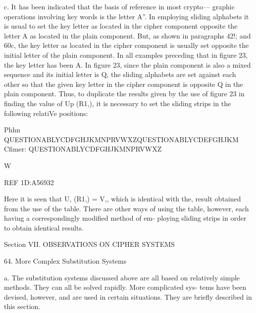 {{{c. It has been indicated that the basis of reference in most crypto—
graphic operations involving key words is the letter A”. In employing
sliding alphabets it is usual to set the key letter as located in the cipher
component opposite the letter A as located in the plain component. But,
as shown in paragraphs 42!; and 60c, the key letter as located in the
cipher component is usually set opposite the initial letter of the plain
component. In all examples preceding that in ﬁgure 23, the key letter has
been A. In ﬁgure 23, since the plain component is also a mixed sequence
and its initial letter is Q, the sliding alphabets are set against each other
so that the given key letter in the cipher component is opposite Q in the
plain component. Thus, to duplicate the results given by the use of ﬁgure
23 in ﬁnding the value of Up (R1,), it is necessary to set the sliding strips
in the following relatiVe positions:

Phhn QUESTIONABLYCDFGHJKMNPRVWXZQUESTIONABLYCDEFGHJKM
Cﬁmer: QUESTIONABLYCDFGHJKMNPRVWXZ

W

 

 

 

 

 

REF 1D:A56932

Here it is seen that U, (R1,) = V,, which is identical with the, result
obtained from the use of the table. There are other ways of using the
table, however, each having a correspondingly modiﬁed method of em-
ploying sliding strips in order to obtain identical results.

Section VII. OBSERVATIONS ON CIPHER SYSTEMS

64. More Complex Substitution Systems

a. The substitution systems discussed above are all based on relatively
simple methods. They can all be solved rapidly. More complicated sys-
tems have been devised, however, and are used in certain situations.
They are brieﬂy described in this section.

}}}
